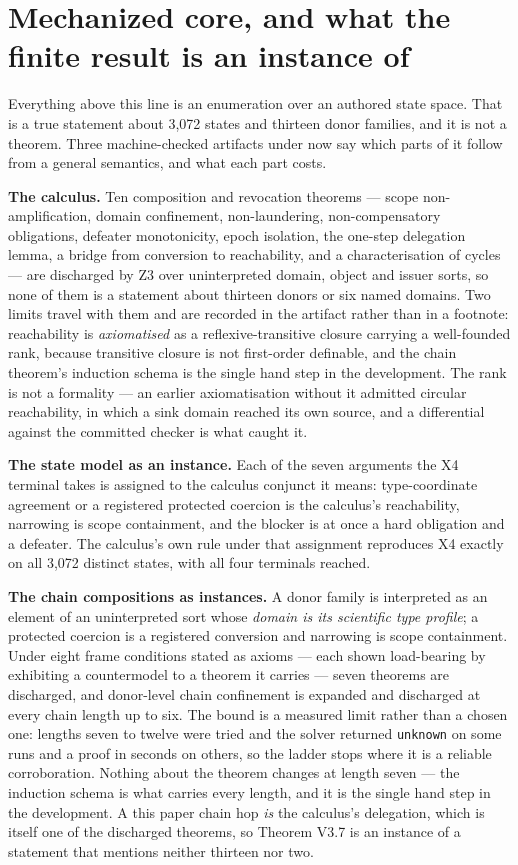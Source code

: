 \section{Mechanized core, and what the finite result is an instance of}

Everything above this line is an enumeration over an authored state space. That is a true statement about 3,072 states and thirteen donor families, and it is not a theorem. Three machine-checked artifacts under  now say which parts of it follow from a general semantics, and what each part costs.

\textbf{The calculus.} Ten composition and revocation theorems --- scope non-amplification, domain confinement, non-laundering, non-compensatory obligations, defeater monotonicity, epoch isolation, the one-step delegation lemma, a bridge from conversion to reachability, and a characterisation of cycles --- are discharged by Z3 over uninterpreted domain, object and issuer sorts, so none of them is a statement about thirteen donors or six named domains. Two limits travel with them and are recorded in the artifact rather than in a footnote: reachability is \emph{axiomatised} as a reflexive-transitive closure carrying a well-founded rank, because transitive closure is not first-order definable, and the chain theorem's induction schema is the single hand step in the development. The rank is not a formality --- an earlier axiomatisation without it admitted circular reachability, in which a sink domain reached its own source, and a differential against the committed checker is what caught it.

\textbf{The state model as an instance.} Each of the seven arguments the X4 terminal takes is assigned to the calculus conjunct it means: type-coordinate agreement or a registered protected coercion is the calculus's reachability, narrowing is scope containment, and the blocker is at once a hard obligation and a defeater. The calculus's own rule under that assignment reproduces X4 exactly on all 3,072 distinct states, with all four terminals reached.

\textbf{The chain compositions as instances.} A donor family is interpreted as an element of an uninterpreted sort whose \emph{domain is its scientific type profile}; a protected coercion is a registered conversion and narrowing is scope containment. Under eight frame conditions stated as axioms --- each shown load-bearing by exhibiting a countermodel to a theorem it carries --- seven theorems are discharged, and donor-level chain confinement is expanded and discharged at every chain length up to six. The bound is a measured limit rather than a chosen one: lengths seven to twelve were tried and the solver returned \texttt{unknown} on some runs and a proof in seconds on others, so the ladder stops where it is a reliable corroboration. Nothing about the theorem changes at length seven --- the induction schema is what carries every length, and it is the single hand step in the development. A this paper chain hop \emph{is} the calculus's delegation, which is itself one of the discharged theorems, so Theorem V3.7 is an instance of a statement that mentions neither thirteen nor two.

